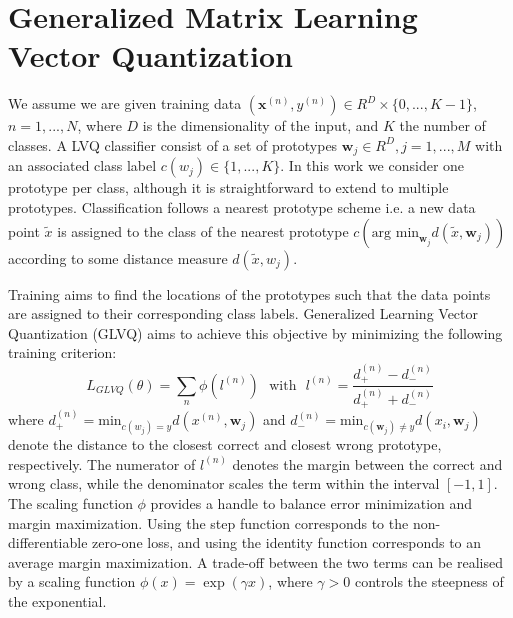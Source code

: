 \documentclass{esannV2}
\begin{document}
\section{Generalized Matrix Learning Vector Quantization}
We assume we are given training data $(\mathbf{x}^{(n)}, y^{(n)}) \in R^D \times \{0, ..., K-1\}$, $n=1, ..., N$, where $D$ is the dimensionality of the input, and $K$ the number of classes. A LVQ classifier consist of a set of prototypes ${\mathbf{w}_j} \in R^D, j=1, ..., M$ with an associated class label $c(w_j) \in \{1, ..., K\}$. In this work we consider one prototype per class, although it is straightforward to extend to multiple prototypes. Classification follows a nearest prototype scheme i.e. a new data point $\tilde{x}$ is assigned to the class of the nearest prototype $c(\mbox{arg min}_{\mathbf{w}_j} d(\tilde{x}, \mathbf{w}_j))$ according to some distance measure $d(\tilde{x}, w_j)$. 

Training aims to find the locations of the prototypes such that the data points are assigned to their corresponding class labels. Generalized Learning Vector Quantization (GLVQ) \cite{sato1996generalized} aims to achieve this objective by minimizing the following training criterion:
\begin{equation}
 L_{GLVQ}(\theta) = \sum_n \phi(l^{(n)}) \mbox{~~with~~} l^{(n)} = \frac{d^{(n)}_+ - d^{(n)}_-}{d^{(n)}_+ + d^{(n)}_-}
\end{equation}
where $d^{(n)}_+ = \mbox{min}_{c(w_j) = y} d(x^{(n)}, \mathbf{w}_j)$ and $d^{(n)}_- = \mbox{min}_{c(\mathbf{w}_j)\neq y} d(x_i, \mathbf{w}_j)$ denote the distance to the closest correct and closest wrong prototype, respectively. The numerator of $l^{(n)}$ denotes the margin between the correct and wrong class, while the denominator scales the term within the interval $[-1, 1]$. The scaling function $\phi$ provides a handle to balance error minimization and margin maximization. Using the step function corresponds to the non-differentiable zero-one loss, and using the identity function corresponds to an average margin maximization. A trade-off between the two terms can be realised by a scaling function $\phi(x) = \exp(\gamma x)$, where $\gamma > 0$ controls the steepness of the exponential. 
\end{document}
